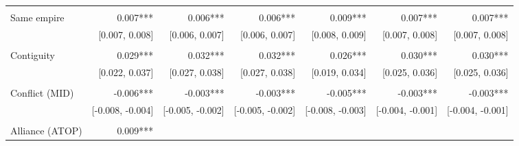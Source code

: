 \begin{table}[!h]
\begin{tabular}{lllllll}
  \multicolumn{1}{r}{} &
  \multicolumn{1}{r}{} &
  \multicolumn{1}{r}{} \\
\multicolumn{1}{l}{Same empire} &
  \multicolumn{1}{|r}{0.007***} &
  \multicolumn{1}{r}{0.006***} &
  \multicolumn{1}{r}{0.006***} &
  \multicolumn{1}{r}{0.009***} &
  \multicolumn{1}{r}{0.007***} &
  \multicolumn{1}{r}{0.007***} \\
\multicolumn{1}{l}{} &
  \multicolumn{1}{|r}{[0.007,   0.008]} &
  \multicolumn{1}{r}{[0.006,   0.007]} &
  \multicolumn{1}{r}{[0.006,   0.007]} &
  \multicolumn{1}{r}{[0.008,   0.009]} &
  \multicolumn{1}{r}{[0.007,   0.008]} &
  \multicolumn{1}{r}{[0.007,   0.008]} \\
\multicolumn{1}{l}{} &
  \multicolumn{1}{|r}{} &
  \multicolumn{1}{r}{} &
  \multicolumn{1}{r}{} &
  \multicolumn{1}{r}{} &
  \multicolumn{1}{r}{} &
  \multicolumn{1}{r}{} \\
\multicolumn{1}{l}{Contiguity} &
  \multicolumn{1}{|r}{0.029***} &
  \multicolumn{1}{r}{0.032***} &
  \multicolumn{1}{r}{0.032***} &
  \multicolumn{1}{r}{0.026***} &
  \multicolumn{1}{r}{0.030***} &
  \multicolumn{1}{r}{0.030***} \\
\multicolumn{1}{l}{} &
  \multicolumn{1}{|r}{[0.022,   0.037]} &
  \multicolumn{1}{r}{[0.027,   0.038]} &
  \multicolumn{1}{r}{[0.027,   0.038]} &
  \multicolumn{1}{r}{[0.019,   0.034]} &
  \multicolumn{1}{r}{[0.025,   0.036]} &
  \multicolumn{1}{r}{[0.025,   0.036]} \\
\multicolumn{1}{l}{} &
  \multicolumn{1}{|r}{} &
  \multicolumn{1}{r}{} &
  \multicolumn{1}{r}{} &
  \multicolumn{1}{r}{} &
  \multicolumn{1}{r}{} &
  \multicolumn{1}{r}{} \\
\multicolumn{1}{l}{Conflict (MID)} &
  \multicolumn{1}{|r}{-0.006***} &
  \multicolumn{1}{r}{-0.003***} &
  \multicolumn{1}{r}{-0.003***} &
  \multicolumn{1}{r}{-0.005***} &
  \multicolumn{1}{r}{-0.003***} &
  \multicolumn{1}{r}{-0.003***} \\
\multicolumn{1}{l}{} &
  \multicolumn{1}{|r}{[-0.008,  -0.004]} &
  \multicolumn{1}{r}{[-0.005,  -0.002]} &
  \multicolumn{1}{r}{[-0.005,  -0.002]} &
  \multicolumn{1}{r}{[-0.008,  -0.003]} &
  \multicolumn{1}{r}{[-0.004,  -0.001]} &
  \multicolumn{1}{r}{[-0.004,  -0.001]} \\
\multicolumn{1}{l}{} &
  \multicolumn{1}{|r}{} &
  \multicolumn{1}{r}{} &
  \multicolumn{1}{r}{} &
  \multicolumn{1}{r}{} &
  \multicolumn{1}{r}{} &
  \multicolumn{1}{r}{} \\
\multicolumn{1}{l}{Alliance (ATOP)} &
  \multicolumn{1}{|r}{0.009***} &

\end{tabular}
\end{table}
